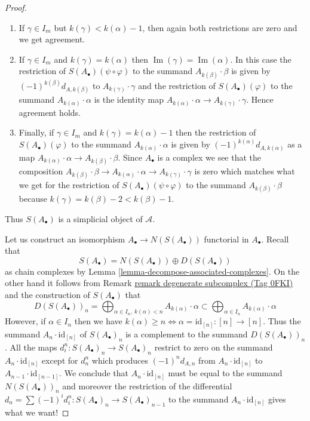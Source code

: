 \documentclass{amsart}
\theoremstyle{plain}
\theoremstyle{definition}
\theoremstyle{remark}
\numberwithin{equation}{subsection}
\def\Im{\mathop{\mathrm{Im}}}
\begin{document}
\begin{proof}
\begin{enumerate}
\begin{enumerate}
\item If $\gamma \in I_m$ but $k(\gamma) < k(\alpha) - 1$, then
again both restrictions are zero and we get agreement.
\item If $\gamma \in I_m$ and $k(\gamma) = k(\alpha)$ then
$\Im(\gamma) = \Im(\alpha)$. In this case
the restriction of $S(A_\bullet)(\psi \circ \varphi)$
to the summand $A_{k(\beta)} \cdot \beta$ is given by
$(-1)^{k(\beta)}d_{A, k(\beta)}$ to $A_{k(\gamma)} \cdot \gamma$
and the restriction of $S(A_\bullet)(\varphi)$ to the summand
$A_{k(\alpha)} \cdot \alpha$ is the identity map
$A_{k(\alpha)} \cdot \alpha \to A_{k(\gamma)} \cdot \gamma$.
Hence agreement holds.
\item Finally, if $\gamma \in I_m$ and $k(\gamma) = k(\alpha) - 1$ then
the restriction of $S(A_\bullet)(\varphi)$ to the summand
$A_{k(\alpha)} \cdot \alpha$ is given by $(-1)^{k(\alpha)} d_{A, k(\alpha)}$
as a map
$A_{k(\alpha)} \cdot \alpha \to A_{k(\beta)} \cdot \beta$.
Since $A_\bullet$ is a complex we see that the composition
$A_{k(\beta)} \cdot \beta \to
A_{k(\alpha)} \cdot \alpha \to A_{k(\gamma)} \cdot \gamma$ is zero
which matches what we get for the restriction of
$S(A_\bullet)(\psi \circ \varphi)$
to the summand $A_{k(\beta)} \cdot \beta$
because $k(\gamma) = k(\beta) - 2 < k(\beta) - 1$.
\end{enumerate}
\end{enumerate}
Thus $S(A_\bullet)$ is a simplicial object of $\mathcal{A}$.

\medskip\noindent
Let us construct an isomorphism $A_\bullet \to N(S(A_\bullet))$
functorial in $A_\bullet$. Recall that
$$
S(A_\bullet) =  N(S(A_\bullet)) \oplus D(S(A_\bullet))
$$
as chain complexes by Lemma \ref{lemma-decompose-associated-complexes}.
On the other hand it follows from Remark \href{https://stacks.math.columbia.edu/tag/0FKI}{remark degenerate subcomplex (Tag 0FKI)}
and the construction of $S(A_\bullet)$ that
$$
D(S(A_\bullet))_n =
\bigoplus\nolimits_{\alpha \in I_n,\ k(\alpha) < n} A_{k(\alpha)} \cdot \alpha
\subset
\bigoplus\nolimits_{\alpha \in I_n} A_{k(\alpha)} \cdot \alpha
$$
However, if $\alpha \in I_n$ then we have
$k(\alpha) \geq n \Leftrightarrow \alpha = \text{id}_{[n]} : [n] \to [n]$.
Thus the summand $A_n \cdot \text{id}_{[n]}$ of $S(A_\bullet)_n$
is a complement to the summand $D(S(A_\bullet))_n$.
All the maps $d^n_i : S(A_\bullet)_n \to S(A_\bullet)_n$
restrict to zero on the summand $A_n \cdot \text{id}_{[n]}$
except for $d^n_n$ which produces $(-1)^n d_{A, n}$
from $A_n \cdot \text{id}_{[n]}$ to $A_{n - 1} \cdot \text{id}_{[n - 1]}$.
We conclude that $A_n \cdot \text{id}_{[n]}$ must be
equal to the summand $N(S(A_\bullet))_n$ and moreover
the restriction of the differential
$d_n = \sum (-1)^id^n_i : S(A_\bullet)_n \to S(A_\bullet)_{n - 1}$
to the summand $A_n \cdot \text{id}_{[n]}$ gives what we want!


\end{proof}
\end{document}
